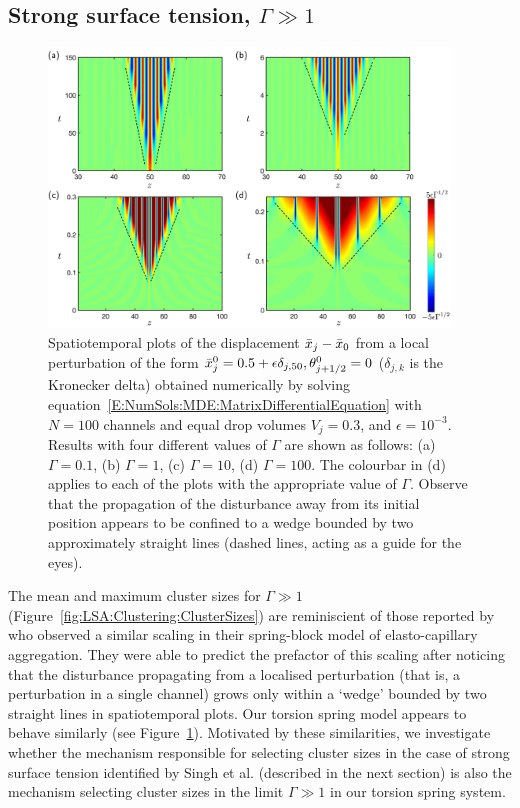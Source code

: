 \subsection{Strong surface tension, $\Gamma \gg 1$}

\begin{figure}[t]
\centering
\includegraphics[width = 0.95\textwidth]{Wedges}
\caption{Spatiotemporal plots of the displacement $\bar{x}_j - \bar{x}_0$ from a local perturbation of the form $\bar{x}_j^0 =0.5 +\epsilon \delta_{j,50}, \theta_{j+1/2}^0 = 0$ ($\delta_{j,k}$ is the Kronecker delta) obtained numerically by solving equation~\eqref{E:NumSols:MDE:MatrixDifferentialEquation} with $N = 100$ channels and equal drop volumes $V_j = 0.3$, and $\epsilon = 10^{-3}$. Results with four different values of $\Gamma$ are shown as follows: (a) $\Gamma = 0.1$, (b) $\Gamma = 1$,  (c) $\Gamma = 10$, (d) $\Gamma = 100$. The colourbar in (d) applies to each of the plots with the appropriate value of $\Gamma$. Observe that the propagation of the disturbance away from its initial position appears to be confined to a wedge bounded by two approximately straight lines (dashed lines, acting as a guide for the eyes).}\label{fig:ClusterSizes:Wedges}
\end{figure}

The mean and maximum cluster sizes for $\Gamma \gg 1$ (Figure~\ref{fig:LSA:Clustering:ClusterSizes}) are reminiscient of those reported by~\cite{Singh2014JFM} who observed a similar scaling in their spring-block model of elasto-capillary aggregation. They were able to predict the prefactor of this scaling after noticing that the disturbance propagating from a localised perturbation (that is, a perturbation in a single channel) grows only within a `wedge' bounded by two straight lines in spatiotemporal plots. Our torsion spring model appears to behave similarly (see Figure~\ref{fig:ClusterSizes:Wedges}). Motivated by these similarities, we investigate whether the mechanism responsible for selecting cluster sizes in the case of strong surface tension identified by Singh et al. (described in the next section) is also the mechanism selecting cluster sizes in the limit $\Gamma \gg 1$ in our torsion spring system.

